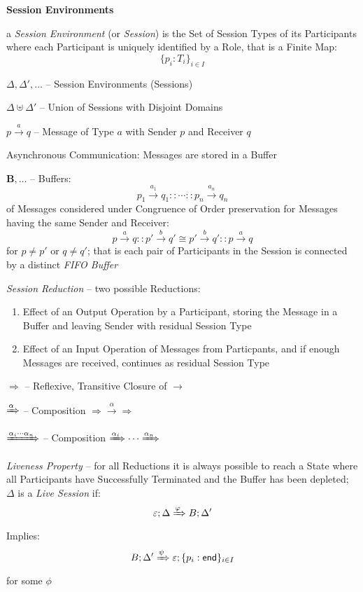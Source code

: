\textbf{Session Environments}

a \emph{Session Environment} (or \emph{Session}) is the Set of Session
Types of its Participants where each Participant is uniquely
identified by a Role, that is a Finite Map:
\[
  \{ p_i : T_i \}_{i \in I}
\]

$\Delta, \Delta', \ldots$ -- Session Environments (Sessions)

$\Delta \uplus \Delta'$ -- Union of Sessions with Disjoint Domains

$p \xrightarrow{a} q$ -- Message of Type $a$ with Sender $p$ and
Receiver $q$

Asynchronous Communication: Messages are stored in a Buffer

$\mathbf{B}, \ldots$ -- Buffers:
\[
  p_1 \xrightarrow{a_1} q_1 :: \cdots :: p_n \xrightarrow{a_n} q_n
\]
of Messages considered under Congruence of Order preservation for
Messages having the same Sender and Receiver:
\[
  p \xrightarrow{a} q :: p' \xrightarrow{b} q' \cong
  p' \xrightarrow{b} q' :: p \xrightarrow{a} q
\]
for $p \neq p'$ or $q \neq q'$; that is each pair of Participants in
the Session is connected by a distinct \emph{FIFO Buffer}

\emph{Session Reduction} -- two possible Reductions: %
\begin{enumerate}
  \item Effect of an Output Operation by a Participant, storing the
    Message in a Buffer and leaving Sender with residual Session Type
  \item Effect of an Input Operation of Messages from Particpants, and
    if enough Messages are received, continues as residual Session
    Type
\end{enumerate}

$\Rightarrow$ -- Reflexive, Transitive Closure of $\rightarrow$

$\xRightarrow{\alpha}$ -- Composition $\Rightarrow
\xrightarrow{\alpha} \Rightarrow$

$\xRightarrow{\alpha_i\cdots\alpha_n}$ -- Composition
$\xRightarrow{\alpha_i}\cdots\xRightarrow{\alpha_n}$

\emph{Liveness Property} -- for all Reductions it is always possible to
reach a State where all Participants have Successfully Terminated and
the Buffer has been depleted; $\Delta$ is a \emph{Live Session} if:
\[
  \varepsilon ; \Delta \xRightarrow{\varphi} B; \Delta'
\]
Implies:
\[
  B ; \Delta' \xRightarrow{\psi} \varepsilon ;
    \{ p_i : \mathsf{end} \}_{i \in I}
\]
for some $\phi$


